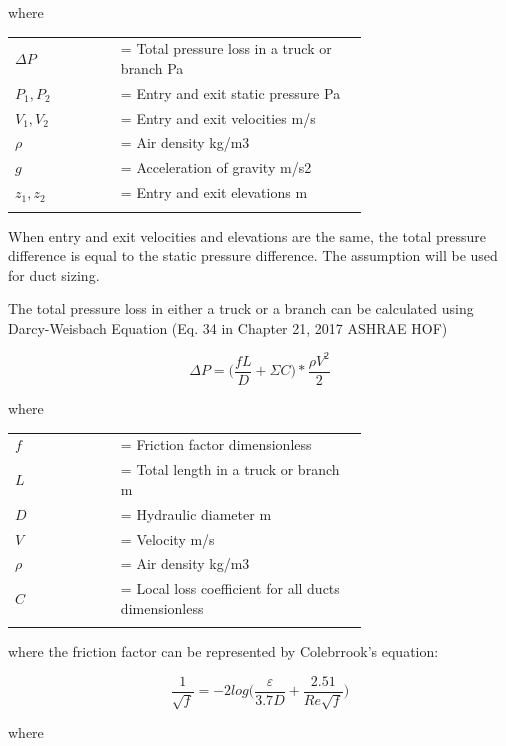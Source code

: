 where

\begin{tabular}{lp{0.7\linewidth}}
\\
$\Delta P$ &= Total pressure loss in a truck or branch {Pa}\\
$P_1, P_2$ &= Entry and exit static pressure {Pa}\\
$V_1, V_2$ &= Entry and exit velocities {m/s}\\
$\rho$ &= Air density {kg/m3}\\
$g$ &= Acceleration of gravity {m/s2}\\
$z_1, z_2$ &= Entry and exit elevations {m}\\
\\
\end{tabular}

When entry and exit velocities and elevations are the same, the total pressure difference is equal to the static pressure difference. The assumption will be used for duct sizing.

The total pressure loss in either a truck or a branch can be calculated using Darcy-Weisbach Equation (Eq. 34 in Chapter 21, 2017 ASHRAE HOF)

\begin{equation}
\Delta P =  \big( \frac{ f L}{D} +  \Sigma C ) *  \frac{ \rho  V^{2} }{2}
\end{equation}

where

\begin{tabular}{lp{0.7\linewidth}}
\\
$f$ &= Friction factor {dimensionless}\\
$L$ &= Total length in a truck or branch {m}\\
$D$ &= Hydraulic diameter {m}\\
$V$ &= Velocity {m/s}\\
$\rho$ &= Air density {kg/m3}\\
$C$ &= Local loss coefficient for all ducts {dimensionless}\\
\\
\end{tabular}

where the friction factor can be represented by Colebrrook's equation:

\begin{equation}
\frac{1}{\sqrt{f}} = -2 log\big( \frac{ \varepsilon }{3.7 D} +  \frac{2.51}{Re\sqrt{f}})
\end{equation}

where

